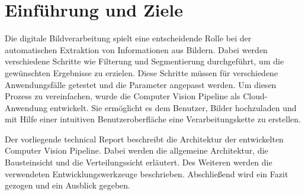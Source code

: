\section{Einführung und Ziele}
Die digitale Bildverarbeitung spielt eine entscheidende Rolle bei der automatischen Extraktion von Informationen aus Bildern. Dabei werden verschiedene Schritte wie Filterung und Segmentierung durchgeführt, um die gewünschten Ergebnisse zu erzielen. Diese Schritte müssen für verschiedene Anwendungsfälle getestet und die Parameter angepasst werden. Um diesen Prozess zu vereinfachen, wurde die \glqq Computer Vision Pipeline\grqq{} als Cloud-Anwendung entwickelt. Sie ermöglicht es dem Benutzer, Bilder hochzuladen und mit Hilfe einer intuitiven Benutzeroberfläche eine Verarbeitungskette zu erstellen.

Der vorliegende technical Report beschreibt die Architektur der entwickelten \glqq Computer Vision Pipeline\grqq{}. Dabei werden die allgemeine Architektur, die Bausteinsicht und die Verteilungssicht erläutert. Des Weiteren werden die verwendeten Entwicklungswerkzeuge beschrieben. Abschließend wird ein Fazit gezogen und ein Ausblick gegeben.